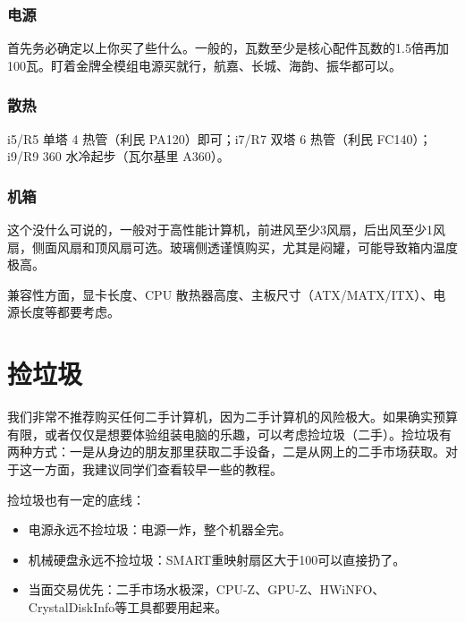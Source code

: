 \documentclass[../main.tex]{subfiles}
\begin{document}
\subsubsection{电源}

首先务必确定以上你买了些什么。一般的，瓦数至少是核心配件瓦数的1.5倍再加100瓦。盯着金牌全模组电源买就行，航嘉、长城、海韵、振华都可以。

\subsubsection{散热}

i5/R5 单塔 4 热管（利民 PA120）即可；i7/R7 双塔 6 热管（利民 FC140）；i9/R9 360 水冷起步（瓦尔基里 A360）。

\subsubsection{机箱}

这个没什么可说的，一般对于高性能计算机，前进风至少3风扇，后出风至少1风扇，侧面风扇和顶风扇可选。玻璃侧透谨慎购买，尤其是闷罐，可能导致箱内温度极高。

兼容性方面，显卡长度、CPU 散热器高度、主板尺寸（ATX/MATX/ITX）、电源长度等都要考虑。

\section{捡垃圾}

我们非常不推荐购买任何二手计算机，因为二手计算机的风险极大。如果确实预算有限，或者仅仅是想要体验组装电脑的乐趣，可以考虑捡垃圾（二手）。捡垃圾有两种方式：一是从身边的朋友那里获取二手设备，二是从网上的二手市场获取。对于这一方面，我建议同学们查看较早一些的教程。

捡垃圾也有一定的底线：
\begin{itemize}
    \item 电源永远不捡垃圾：电源一炸，整个机器全完。
    \item 机械硬盘永远不捡垃圾：SMART重映射扇区大于100可以直接扔了。
    \item 当面交易优先：二手市场水极深，CPU-Z、GPU-Z、HWiNFO、CrystalDiskInfo等工具都要用起来。
\end{itemize}
\end{document}
